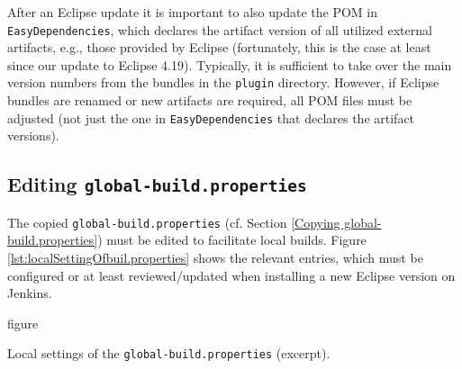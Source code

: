 \begin{description}
After an Eclipse update it is important to also update the POM in \texttt{EasyDependencies}, which declares the artifact version of all utilized external artifacts, e.g., those provided by Eclipse (fortunately, this is the case at least since our update to Eclipse 4.19). Typically, it is sufficient to take over the main version numbers from the bundles in the \texttt{plugin} directory. However, if Eclipse bundles are renamed or new artifacts are required, all POM files must be adjusted (not just the one in \texttt{EasyDependencies} that declares the artifact versions).

\end{description}	

\subsection{Editing \texttt{global-build.properties}}
\label{sec:global-build.properties}
The copied \texttt{global-build.properties} (cf. Section \vref{Copying global-build.properties}) must be edited to facilitate local builds. Figure \vref{lst:localSettingOfbuil.properties} shows the relevant entries, which must be configured or at least reviewed/updated when installing a new Eclipse version on Jenkins.

\begin{nofloat}{figure}
	\centering
	
	\caption[Local settings of the \texttt{global-build.properties}]{Local settings of the \texttt{global-build.properties} (excerpt).}
	\label{lst:localSettingOfbuil.properties}
\end{nofloat}

